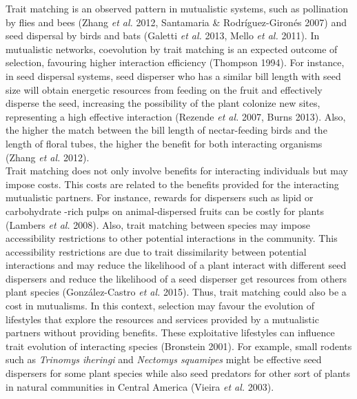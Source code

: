 \documentclass[a4paper, 12pt]{article}
\begin{document}
Trait matching is an observed pattern in mutualistic systems, such as pollination by  flies and bees (Zhang \textit{et al.} 2012, Santamaria \& Rodríguez-Gironés 2007) and seed dispersal by birds and bats (Galetti \textit{et al.} 2013, Mello \textit{et al.} 2011). In mutualistic networks, coevolution by trait matching is an expected outcome of selection, favouring higher interaction efficiency (Thompson 1994). For instance, in seed dispersal systems, seed disperser who has a similar bill length with seed size will obtain energetic resources from feeding on the fruit and effectively disperse the seed, increasing the possibility of the plant colonize new sites, representing a high effective interaction (Rezende \textit{et al.} 2007, Burns 2013). Also, the higher the match between the bill length of nectar-feeding birds and the length of floral tubes, the higher the benefit for both interacting organisms (Zhang \textit{et al.} 2012).\\
Trait matching does not only involve benefits for interacting individuals but may impose costs. This costs are related to the benefits provided for the interacting mutualistic partners. For instance, rewards for dispersers such as lipid or carbohydrate -rich pulps on animal-dispersed fruits can be costly for plants (Lambers \textit{et al.} 2008). Also, trait matching between species may impose accessibility restrictions to other potential interactions in the community. This accessibility restrictions are due to trait dissimilarity between potential interactions and may reduce the  likelihood of a plant interact with different seed dispersers and reduce the likelihood of a seed disperser get resources from others plant species (González-Castro \textit{et al.} 2015). Thus, trait matching could also be a cost in mutualisms. In this context, selection may favour the evolution of lifestyles that explore the resources and services provided by a mutualistic partners without providing benefits. These exploitative lifestyles can influence trait evolution of interacting species (Bronstein 2001). For example, small rodents such as \textit{Trinomys iheringi} and \textit{Nectomys squamipes} might be effective seed dispersers for some plant species while also seed predators for other sort of plants in natural communities in Central America (Vieira \textit{et al.} 2003).\\
\end{document}
